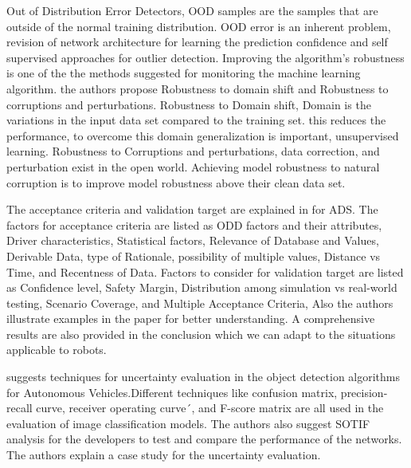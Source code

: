 {Out of Distribution Error Detectors, OOD samples are the samples that are outside of the normal training distribution. OOD error is an inherent problem, revision of network architecture for learning the prediction confidence and self supervised approaches for outlier detection. Improving the algorithm's robustness is one of the the methods suggested for monitoring the machine learning algorithm. the authors propose Robustness to domain shift and Robustness to corruptions and perturbations. Robustness to Domain shift, Domain is the variations in the input data set compared to the training set. this reduces the performance, to overcome this domain generalization is important, unsupervised learning. Robustness to Corruptions and perturbations, data correction, and perturbation exist in the open world. Achieving model robustness to natural corruption is to improve model robustness above their clean data set.

The acceptance criteria and validation target are explained in \cite{author28} for ADS. The factors for acceptance criteria are listed as ODD factors and their attributes, Driver characteristics, Statistical factors, Relevance of Database and Values, Derivable Data, type of Rationale, possibility of multiple values, Distance vs Time, and Recentness of Data. Factors to consider for validation target are listed as Confidence level, Safety Margin, Distribution among simulation vs real-world testing, Scenario Coverage, and Multiple Acceptance Criteria, Also the authors illustrate examples in the paper for better understanding. A comprehensive results are also provided in the conclusion which we can adapt to the situations applicable to robots.

\cite{author28} suggests techniques for uncertainty evaluation in the object detection algorithms for Autonomous Vehicles.Different techniques like confusion matrix, precision-recall curve, receiver operating curve´, and F-score matrix are all used in the evaluation of image classification models. The authors also suggest SOTIF analysis for the developers to test and compare the performance of the networks. The authors explain a case study for the uncertainty evaluation. 

}
